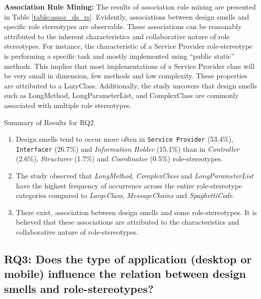 \documentclass[AMA,Times1COL]{WileyNJDv5} %
\begin{document}
	\textbf{Association Rule Mining:} The results of association rule mining are presented in Table \ref{table:assoc_ds_rs}. Evidently, associations between design smells and specific role stereotypes are observable. These associations can be reasonably attributed to the inherent characteristics and collaborative nature of role stereotypes. For instance, the characteristic of a Service Provider role-stereotype is performing a specific task and mostly implemented using “public static” methods. This implies that most implementations of a Service Provider class will be very small in dimension, few methods and low complexity. These properties are attributed to a LazyClass. Additionally, the study uncovers that design smells such as LongMethod, LongParameterList, and ComplexClass are commonly associated with multiple role stereotypes.
		\begin{boxwithhead}
		{Summary of Results for RQ2}
		{\noindent 
			\begin{enumerate}
				\item Design smells tend to occur more often in {\tt Service Provider} (53.4\%), {\tt Interfacer} (26.7\%) and \textit{Information Holder} (15.1\%) than in \textit{Controller} (2.6\%), \textit{Structurer} (1.7\%) and \textit{Coordinator} (0.5\%) role-stereotypes.
				\item The study observed that \textit{LongMethod}, \textit{ComplexClass} and \textit{LongParameterList} have the highest frequency of occurrence across the entire role-stereotype categories compared to \textit{LargeClass}, \textit{MessageChains} and \textit{SpaghettiCode}.
				\item There exist, association between design smells and some role-stereotypes. It is believed that these associations are attributed to the characteristics and collaborative nature of role-stereotypes.
			\end{enumerate}
		}
	\end{boxwithhead}
	
	\subsection*{RQ3: Does the type of application (desktop or mobile) influence the relation between design smells and role-stereotypes?}
	
\end{document}
